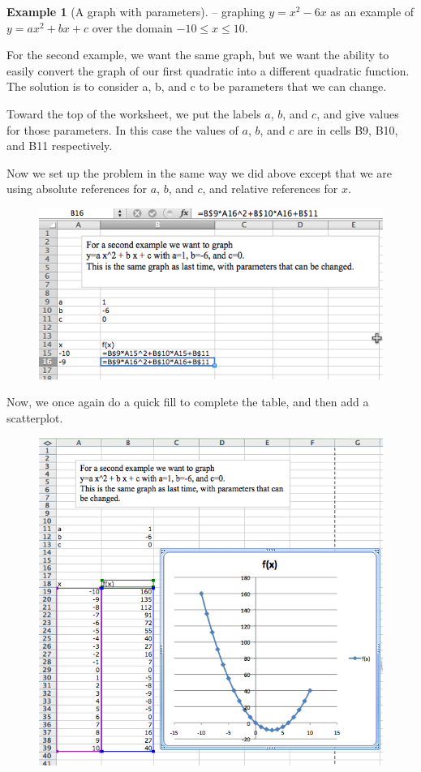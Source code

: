 \documentclass[10pt,]{book}
\theoremstyle{plain}
\theoremstyle{definition}
\newtheorem{example}[theorem]{Example}
\theoremstyle{definition}
\begin{document}
\begin{example}[A graph with parameters]\label{example-6}
 – graphing \(y=x^2-6 x\) as an example of 
\(y = a x^2 + b x + c\) over the domain \(-10 \le x \le 10\).%
\par
For the second example, we want the same graph, but we want the ability to easily convert the graph of our first quadratic into a different quadratic function.  The solution is to consider a, b, and c to be parameters that we can change.%
\par
Toward the top of the worksheet, we put the labels \(a\), \(b\), and \(c\), and give values for those parameters.  In this case the values of \(a\), \(b\), and \(c\) are in cells B9, B10, and B11 respectively.%
\par
Now we set up the problem in the same way we did above except that we are using absolute references for \(a\), \(b\), and \(c\), and relative references for \(x\).
%
\leavevmode%
\begin{figure}
\centering
\includegraphics[width=0.8\linewidth]{images/sec1-4-5.png}
\end{figure}
\par
Now, we once again do a quick fill to complete the table, and then add a scatterplot.%
\leavevmode%
\begin{figure}
\centering
\includegraphics[width=0.8\linewidth]{images/sec1-4-6.png}

\end{figure}
\end{example}
\end{document}
